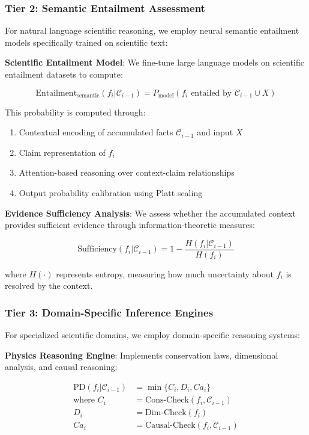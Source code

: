 \documentclass{uai2026} %
\theoremstyle{remark}
\theoremstyle{plain}
\theoremstyle{definition}
\begin{document}
\subsubsection*{Tier 2: Semantic Entailment Assessment}

For natural language scientific reasoning, we employ neural semantic entailment models specifically trained on scientific text:

\textbf{Scientific Entailment Model}: We fine-tune large language models on scientific entailment datasets to compute:

$$\text{Entailment}_{\text{semantic}}(f_i | \mathcal{C}_{i-1}) = P_{\text{model}}(f_i \text{ entailed by } \mathcal{C}_{i-1} \cup X)$$

This probability is computed through:
\begin{enumerate}
\item Contextual encoding of accumulated facts $\mathcal{C}_{i-1}$ and input $X$
\item Claim representation of $f_i$
\item Attention-based reasoning over context-claim relationships
\item Output probability calibration using Platt scaling
\end{enumerate}

\textbf{Evidence Sufficiency Analysis}: We assess whether the accumulated context provides sufficient evidence through information-theoretic measures:

$$\text{Sufficiency}(f_i | \mathcal{C}_{i-1}) = 1 - \frac{H(f_i | \mathcal{C}_{i-1})}{H(f_i)}$$

where $H(\cdot)$ represents entropy, measuring how much uncertainty about $f_i$ is resolved by the context.

\subsubsection*{Tier 3: Domain-Specific Inference Engines}

For specialized scientific domains, we employ domain-specific reasoning systems:

\textbf{Physics Reasoning Engine}: Implements conservation laws, dimensional analysis, and causal reasoning:

\begin{align}
\text{PD}(f_i | \mathcal{C}_{i-1}) &= \min\{C_i, D_i, Ca_i\} \\
\text{where } C_i &= \text{Cons-Check}(f_i, \mathcal{C}_{i-1}) \nonumber \\
D_i &= \text{Dim-Check}(f_i) \nonumber \\
Ca_i &= \text{Causal-Check}(f_i, \mathcal{C}_{i-1}) \nonumber
\end{align}
\end{document}
